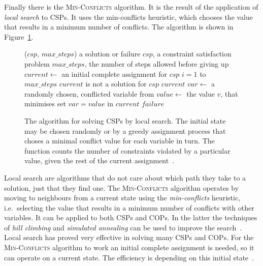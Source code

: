 Finally there is the \textsc{Min-Conflicts} algorithm. It is the result of the application of \textit{local search} to CSPs. It uses the min-conflicts heuristic, which chooses the value that results in a minimum number of conflicts. The algorithm is shown in Figure~\ref{fig:minConflicts}.
\clearpage
\begin{figure}[ht!p]
	\newsavebox{\minconflictsbox}
	\begin{lrbox}{\minconflictsbox}
	\begin{minipage}{.8\largefigure}
		\vspace{-5pt}
		\begin{codebox}
\zi {}($csp$, $max\_steps$)  a solution or failure
    \Indentmore
\zi {}
    \Indentmore
    \zi $csp$, a constraint satisfaction problem
    \zi $max\_steps$, the number of steps allowed before giving up \End
\zi $current \leftarrow$ an initial complete assignment for $csp$
    \zi \For $i = 1$ to $max\_steps$  \Do
    \zi     \If $current$ is not a solution for $csp$
    \zi     \Then \Return $current$ \End
    \zi     $var \leftarrow$ a randomly chosen,
    \zi     \hspace{28pt} conflicted variable from 
    \zi     $value \leftarrow$ the value $v$,
    \zi     \hspace{37pt} that minimises 
    \zi     set $var = value$ in $current$ \End
    \zi \Return $failure$
    \End
		\end{codebox}
		\vspace{-5pt}
	\end{minipage}
	\end{lrbox}\fbox{\usebox{\minconflictsbox}}
		\caption{The  algorithm for solving CSPs by local search. The initial state may be chosen randomly or by a greedy assignment process that choses a minimal conflict value for each variable in turn. The  function counts the number of constraints violated by a particular value, given the rest of the current assignment~\protect{}.}
	\label{fig:minConflicts}
\end{figure}

Local search are algorithms that do not care about which path they take to a solution, just that they find one. The \textsc{Min-Conflicts} algorithm operates by moving to neighbours from a current state using the \emph{min-conflicts} heuristic, i.e.\ selecting the value that results in a minimum number of conflicts with other variables. It can be applied to both CSPs and COPs. In the latter the techniques of \emph{hill climbing} and \emph{simulated annealing} can be used to improve the search~\cite{LSVossen}. Local search has proved very effective in solving many CSPs and COPs. For the \textsc{Min-Conflicts} algorithm to work an initial complete assignment is needed, so it can operate on a current state. The efficiency is depending on this initial state~.

